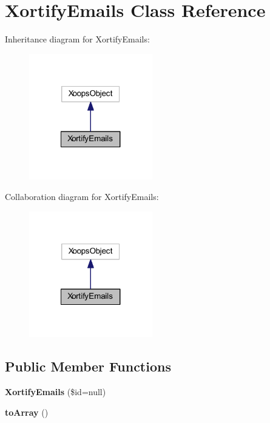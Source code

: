 \hypertarget{class_xortify_emails}{\section{Xortify\-Emails Class Reference}
\label{class_xortify_emails}
}


Inheritance diagram for Xortify\-Emails\-:
\nopagebreak
\begin{figure}[H]
\begin{center}
\leavevmode
\includegraphics[width=152pt]{class_xortify_emails__inherit__graph}
\end{center}
\end{figure}


Collaboration diagram for Xortify\-Emails\-:
\nopagebreak
\begin{figure}[H]
\begin{center}
\leavevmode
\includegraphics[width=152pt]{class_xortify_emails__coll__graph}
\end{center}
\end{figure}
\subsection*{Public Member Functions}
\begin{DoxyCompactItemize}
\item 
\hypertarget{class_xortify_emails_ab957a2cd087fd52a2718edf6cecca3ab}{{\bfseries Xortify\-Emails} (\$id=null)}\label{class_xortify_emails_ab957a2cd087fd52a2718edf6cecca3ab}

\item 
\hypertarget{class_xortify_emails_a658defb34762c8f40085aec87e16ba1a}{{\bfseries to\-Array} ()}\label{class_xortify_emails_a658defb34762c8f40085aec87e16ba1a}

\end{DoxyCompactItemize}
